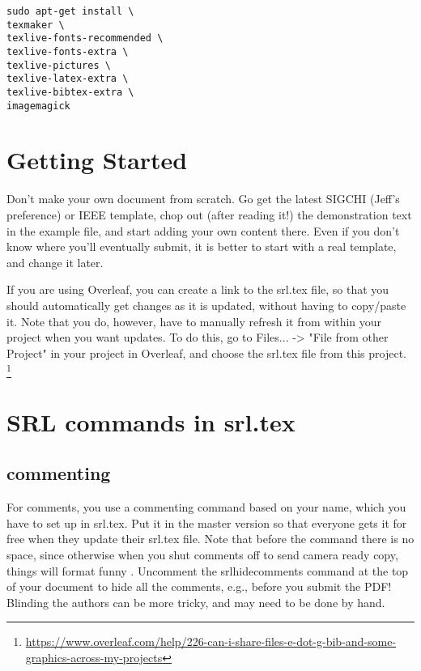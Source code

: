 \documentclass{sigchi}
\begin{document}
\begin{verbatim}
sudo apt-get install \
texmaker \
texlive-fonts-recommended \
texlive-fonts-extra \
texlive-pictures \
texlive-latex-extra \
texlive-bibtex-extra \
imagemagick
\end{verbatim}

\section{Getting Started}
Don't make your own document from scratch.
Go get the latest SIGCHI (Jeff's preference) or IEEE template, chop out (after reading it!) the demonstration text in the example file, and start adding your own content there.
Even if you don't know where you'll eventually submit, it is better to start with a real template, and change it later.

If you are using Overleaf, you can create a link to the srl.tex file, so that you should automatically get changes as it is updated, without having to copy/paste it.
Note that you do, however, have to manually refresh it from within your project when you want updates.
To do this, go to Files... -> "File from other Project" in your project in Overleaf, and choose the srl.tex file from this project.
\footnote{\url{https://www.overleaf.com/help/226-can-i-share-files-e-dot-g-bib-and-some-graphics-across-my-projects}}

\section{SRL commands in srl.tex}



\subsection{commenting}
For comments, you use a commenting command based on your name, which you have to set up in srl.tex.
Put it in the master version so that everyone gets it for free when they update their srl.tex file.
Note that before the command there is no space, since otherwise when you shut comments off to send camera ready copy, things will format funny .
Uncomment the srlhidecomments command at the top of your document to hide all the comments, e.g., before you submit the PDF!
Blinding the authors can be more tricky, and may need to be done by hand.
\end{document}
